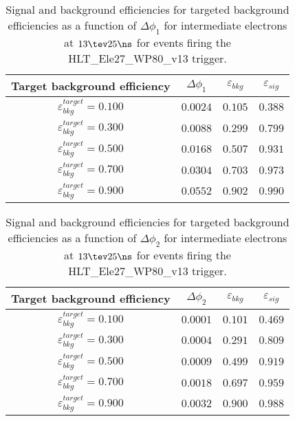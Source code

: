 \clearpage

\begin{table}[!bht]
  \begin{center}
    \begin{tabular}{cccc}
      \hline
      Target background efficiency & $\Delta\phi_1$ & $\varepsilon_{bkg}$ & $\varepsilon_{sig}$ \\ 
      \hline
      $\varepsilon_{bkg}^{target} = 0.100$ & $  0.0024$ & $0.105$ & $0.388$ \\
      $\varepsilon_{bkg}^{target} = 0.300$ & $  0.0088$ & $0.299$ & $0.799$ \\
      $\varepsilon_{bkg}^{target} = 0.500$ & $  0.0168$ & $0.507$ & $0.931$ \\
      $\varepsilon_{bkg}^{target} = 0.700$ & $  0.0304$ & $0.703$ & $0.973$ \\
      $\varepsilon_{bkg}^{target} = 0.900$ & $  0.0552$ & $0.902$ & $0.990$ \\
      \hline
    \end{tabular}
    \caption{Signal and background efficiencies for targeted background efficiencies as a function of $\Delta\phi_1$ for intermediate electrons at $13\tev 25\ns$ for events firing the HLT\_Ele27\_WP80\_v13 trigger.}
    \label{tab:eff_rej_phi1_beam_13_25_trigger_27_I}
  \end{center}
\end{table}

\clearpage

\begin{table}[!bht]
  \begin{center}
    \begin{tabular}{cccc}
      \hline
      Target background efficiency & $\Delta\phi_2$ & $\varepsilon_{bkg}$ & $\varepsilon_{sig}$ \\ 
      \hline
      $\varepsilon_{bkg}^{target} = 0.100$ & $  0.0001$ & $0.101$ & $0.469$ \\
      $\varepsilon_{bkg}^{target} = 0.300$ & $  0.0004$ & $0.291$ & $0.809$ \\
      $\varepsilon_{bkg}^{target} = 0.500$ & $  0.0009$ & $0.499$ & $0.919$ \\
      $\varepsilon_{bkg}^{target} = 0.700$ & $  0.0018$ & $0.697$ & $0.959$ \\
      $\varepsilon_{bkg}^{target} = 0.900$ & $  0.0032$ & $0.900$ & $0.988$ \\
      \hline
    \end{tabular}
    \caption{Signal and background efficiencies for targeted background efficiencies as a function of $\Delta\phi_2$ for intermediate electrons at $13\tev 25\ns$ for events firing the HLT\_Ele27\_WP80\_v13 trigger.}
    \label{tab:eff_rej_phi2_beam_13_25_trigger_27_I}
  \end{center}
\end{table}

